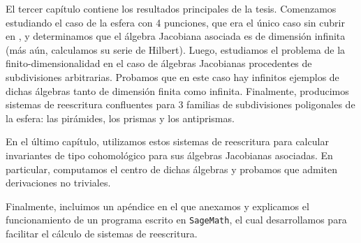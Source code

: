 \begin{chapter}
El tercer capítulo contiene los resultados principales de la tesis. Comenzamos estudiando el caso de la esfera con 4 punciones, que era el único caso sin cubrir en \cite{Lad12}, y determinamos que el álgebra Jacobiana asociada es de dimensión infinita (más aún, calculamos su serie de Hilbert). Luego, estudiamos el problema de la finito-dimensionalidad en el caso de álgebras Jacobianas procedentes de subdivisiones arbitrarias. Probamos que en este caso hay infinitos ejemplos de dichas álgebras tanto de dimensión finita como infinita. Finalmente, producimos sistemas de reescritura confluentes para 3 familias de subdivisiones poligonales de la esfera: las pirámides, los prismas y los antiprismas.

En el último capítulo, utilizamos estos sistemas de reescritura para calcular invariantes de tipo cohomológico para sus álgebras Jacobianas asociadas. En particular, computamos el centro de dichas álgebras y probamos que admiten derivaciones no triviales.

Finalmente, incluimos un apéndice en el que anexamos y explicamos el funcionamiento de un programa escrito en \texttt{SageMath}, el cual desarrollamos para facilitar el cálculo de sistemas de reescritura.
\end{chapter}